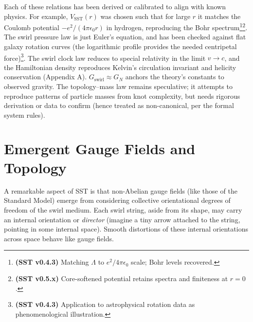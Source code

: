 \documentclass[reprint,aps,onecolumn,nofootinbib]{revtex4-2}
\begin{document}
    Each of these relations has been derived or calibrated to align with known physics. For example, $V_{\text{SST}}(r)$ was chosen such that for large $r$ it matches the Coulomb potential $-e^2/(4\pi\epsilon_0 r)$ in hydrogen, reproducing the Bohr spectrum\footnote{\textbf{(SST v0.4.3)} Matching $\Lambda$ to $e^2/4\pi\epsilon_0$ scale; Bohr levels recovered.}\footnote{\textbf{(SST v0.5.x)} Core-softened potential retains spectra and finiteness at $r=0$.}. The swirl pressure law is just Euler’s equation, and has been checked against flat galaxy rotation curves (the logarithmic profile provides the needed centripetal force)\footnote{\textbf{(SST v0.4.3)} Application to astrophysical rotation data as phenomenological illustration.}. The swirl clock law reduces to special relativity in the limit $v\to c$, and the Hamiltonian density reproduces Kelvin’s circulation invariant and helicity conservation (Appendix A). $G_{\text{swirl}}\approx G_N$ anchors the theory’s constants to observed gravity. The topology–mass law remains speculative; it attempts to reproduce patterns of particle masses from knot complexity, but needs rigorous derivation or data to confirm (hence treated as non-canonical, per the formal system rules).

\section{Emergent Gauge Fields and Topology}
    A remarkable aspect of SST is that non-Abelian gauge fields (like those of the Standard Model) emerge from considering collective orientational degrees of freedom of the swirl medium. Each swirl string, aside from its shape, may carry an internal orientation or \emph{director} (imagine a tiny arrow attached to the string, pointing in some internal space). Smooth distortions of these internal orientations across space behave like gauge fields.
\end{document}
